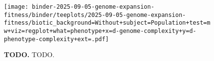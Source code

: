 \begin{figure}
\centering
\texttt{[image: binder-2025-09-05-genome-expansion-fitness/binder/teeplots/2025-09-05-genome-expansion-fitness/biotic\_background=Without+subject=Population+test=mw+viz=regplot+what=phenotype+x=d-genome-complexity+y=d-phenotype-complexity+ext=.pdf]}
\caption{%
\textbf{TODO.}
TODO.
}
\label{fig:gpcomplex-correlation}
\end{figure}
